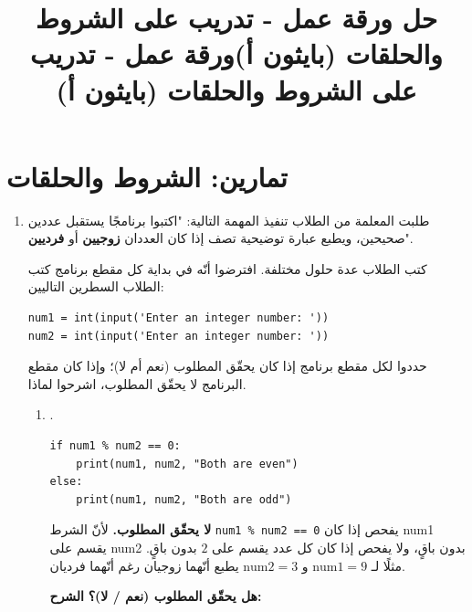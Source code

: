 \documentclass[14pt]{extarticle}
\title{حل ورقة عمل - تدريب على الشروط والحلقات (بايثون أ)}
\title{ورقة عمل - تدريب على الشروط والحلقات (بايثون أ)}
\begin{document}
\maketitle
\thispagestyle{fancy}

\section*{تمارين: الشروط والحلقات}

\begin{enumerate}[label=\textbf{تمرين \arabic*:}, wide=0pt, itemsep=2.2em]

\item طلبت المعلمة من الطلاب تنفيذ المهمة التالية:
"اكتبوا برنامجًا يستقبل عددين صحيحين، ويطبع عبارة توضيحية تصف إذا كان العددان \textbf{زوجيين} أو \textbf{فرديين}".

كتب الطلاب عدة حلول مختلفة. افترضوا أنّه في بداية كل مقطع برنامج كتب الطلاب السطرين التاليين:
\begin{boxCode}
\begin{english}
\begin{verbatim}
num1 = int(input('Enter an integer number: '))
num2 = int(input('Enter an integer number: '))
\end{verbatim}
\end{english}
\end{boxCode}

حددوا لكل مقطع برنامج إذا كان يحقّق المطلوب (نعم أم لا)؛ وإذا كان مقطع البرنامج لا يحقّق المطلوب، اشرحوا لماذا.

\begin{enumerate}[label=\alph*., itemsep=1.5em]

\item .
\begin{boxCode}
\begin{english}
\begin{verbatim}
if num1 % num2 == 0:
    print(num1, num2, "Both are even")
else:
    print(num1, num2, "Both are odd")
\end{verbatim}
\end{english}
\end{boxCode}
\ifwithsols
\begin{boxSolution}
\textbf{لا يحقّق المطلوب.} لأنّ الشرط \textenglish{\texttt{num1 \% num2 == 0}} يفحص إذا كان \textenglish{num1} يقسم على \textenglish{num2} بدون باقٍ، ولا يفحص إذا كان كل عدد يقسم على $2$ بدون باقٍ. مثلًا لـ $\text{num1} = 9$ و $\text{num2} = 3$ يطبع أنّهما زوجيان رغم أنّهما فرديان.
\end{boxSolution}
\else
\textbf{هل يحقّق المطلوب (نعم / لا)؟} \underline{\hspace{3cm}} \quad \textbf{الشرح:} \underline{\hspace{7cm}}
\fi
\filbreak


\end{enumerate}
\end{enumerate}
\end{document}
